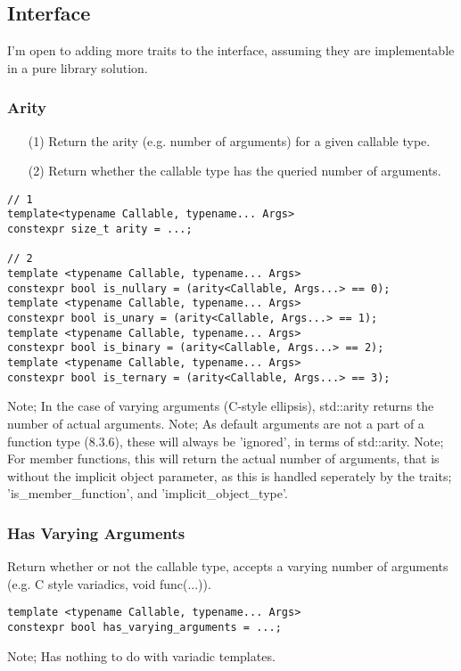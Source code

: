 \subsection{Interface}
I'm open to adding more traits to the interface, assuming they are implementable
in a pure library solution.

\subsubsection{Arity}
\begin{itemize}
\item[(1)] Return the arity (e.g. number of arguments) for a given callable type.
\item[(2)] Return whether the callable type has the queried number of arguments.
\end{itemize}
\begin{verbatim}
// 1
template<typename Callable, typename... Args>
constexpr size_t arity = ...;

// 2
template <typename Callable, typename... Args>
constexpr bool is_nullary = (arity<Callable, Args...> == 0);
template <typename Callable, typename... Args>
constexpr bool is_unary = (arity<Callable, Args...> == 1);
template <typename Callable, typename... Args>
constexpr bool is_binary = (arity<Callable, Args...> == 2);
template <typename Callable, typename... Args>
constexpr bool is_ternary = (arity<Callable, Args...> == 3);
\end{verbatim}
Note; In the case of varying arguments (C-style ellipsis), std::arity returns the
number of actual arguments.
Note; As default arguments are not a part of a function type (8.3.6), these will
always be 'ignored', in terms of std::arity.
Note; For member functions, this will return the actual number of arguments, 
that is without the implicit object parameter, as this is handled seperately by
the traits; 'is\_member\_function', and 'implicit\_object\_type'.

\subsubsection{Has Varying Arguments}
Return whether or not the callable type, accepts a varying number of arguments
(e.g. C style variadics, void func(...)).
\begin{verbatim}
template <typename Callable, typename... Args>
constexpr bool has_varying_arguments = ...;
\end{verbatim}
Note; Has nothing to do with variadic templates.

